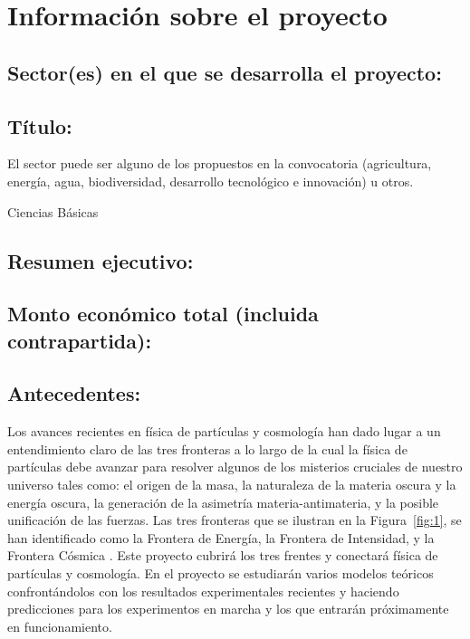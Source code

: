 
\section{Información sobre el proyecto}

\subsection{Sector(es)  en el que se desarrolla el proyecto:}

\subsection{Título:                                        }
\begin{instrucciones}
  El sector puede ser alguno de los propuestos en la convocatoria
  (agricultura, energía, agua, biodiversidad, desarrollo tecnológico e
  innovación) u otros.
\end{instrucciones}
Ciencias Básicas
\subsection{Resumen ejecutivo:                            }
\subsection{Monto económico total (incluida contrapartida):}
\subsection{Antecedentes:                                  }
Los avances recientes en física de partículas y cosmología han dado
lugar a un entendimiento claro de las tres fronteras a lo largo de la
cual la física de partículas debe avanzar para resolver algunos de los
misterios cruciales de nuestro universo tales como: el origen de la
masa, la naturaleza de la materia oscura y la energía oscura, la
generación de la asimetría materia-antimateria, y la posible
unificación de las fuerzas. Las tres fronteras que se ilustran en la
Figura~\ref{fig:1}, se han identificado como la Frontera de Energía,
la Frontera de Intensidad, y la Frontera Cósmica \cite{fermilab}. Este
proyecto cubrirá los tres frentes y conectará física de partículas y
cosmología. En el proyecto se estudiarán varios modelos teóricos
confrontándolos con los resultados experimentales recientes y haciendo
predicciones para los experimentos en marcha y los que entrarán
próximamente en funcionamiento.

